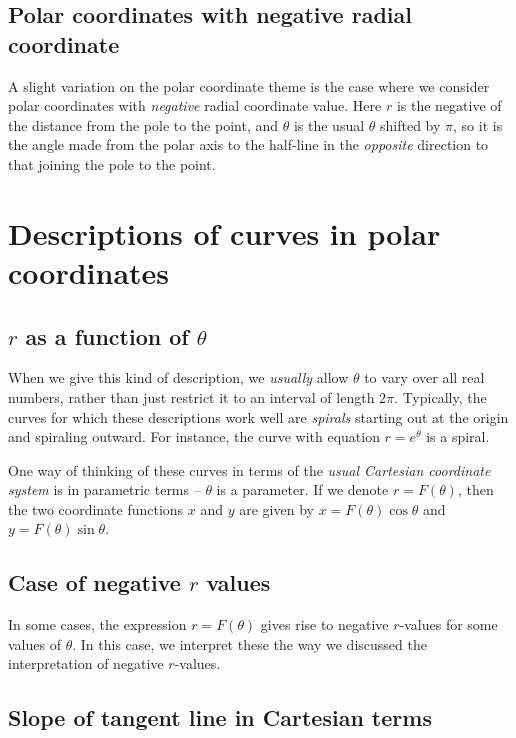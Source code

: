 \documentclass[10pt]{amsart}
\begin{document}
\subsection{Polar coordinates with negative radial coordinate}

A slight variation on the polar coordinate theme is the case where we
consider polar coordinates with {\em negative} radial coordinate
value. Here $r$ is the negative of the distance from the pole to the
point, and $\theta$ is the usual $\theta$ shifted by $\pi$, so it is
the angle made from the polar axis to the half-line in the {\em
opposite} direction to that joining the pole to the point.
\section{Descriptions of curves in polar coordinates}

\subsection{$r$ as a function of $\theta$}

When we give this kind of description, we {\em usually} allow $\theta$
to vary over all real numbers, rather than just restrict it to an
interval of length $2\pi$. Typically, the curves for which these
descriptions work well are {\em spirals} starting out at the origin
and spiraling outward. For instance, the curve with equation $r =
e^{\theta}$ is a spiral.

One way of thinking of these curves in terms of the {\em usual
Cartesian coordinate system} is in parametric terms -- $\theta$ is a
parameter. If we denote $r = F(\theta)$, then the two coordinate
functions $x$ and $y$ are given by $x = F(\theta)\cos \theta$ and $y =
F(\theta)\sin \theta$.

\subsection{Case of negative $r$ values}

In some cases, the expression $r = F(\theta)$ gives rise to negative
$r$-values for some values of $\theta$. In this case, we interpret
these the way we discussed the interpretation of negative $r$-values.

\subsection{Slope of tangent line in Cartesian terms}
\end{document}
